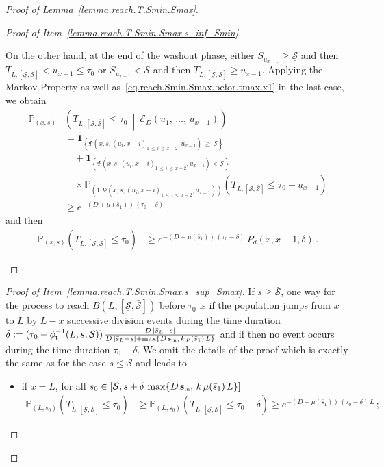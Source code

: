 \documentclass[10pt]{amsart}
\theoremstyle{definition}\newtheorem{defi}[theo]{Definition}\newtheorem{rema}[theo]{Remark}\newtheorem{exam}[theo]{Example}\newtheorem{exem}[theo]{Example}\newtheorem{nota}[theo]{Notation}
\newcommand{\PP}{\mathbb{P}}
\newcommand{\clE}{\mathcal{E}}
\newcommand{\Sin}{{\mathbf s}_{\textrm{\tiny\rm in}}}
\newcommand{\Smin}{\underline{\mathcal{S}}}
\newcommand{\Smax}{\bar{\mathcal{S}}}
\newcommand{\barmu}{\mu(\bar s_1)}
\newcommand{\phit}{\phi_\textsf{t}^{-1}}
\newcommand{\1}{\mathbf{1}}
\begin{document}
\begin{proof}[Proof of Lemma~\ref{lemma.reach.T.Smin.Smax}]
\begin{proof}[{Proof of Item~\eqref{lemma.reach.T.Smin.Smax.s_inf_Smin}}]
\begin{itemize}
On the other hand, at the end of the washout phase, either $S_{u_{x-1}}\geq \Smin$ and then $T_{L,[\Smin,\Smax]}< u_{x-1}\leq\tau_0$ or $S_{u_{x-1}}< \Smin$ and then $T_{L,[\Smin,\Smax]}\geq u_{x-1}$. Applying the Markov Property as well as~\eqref{eq.reach.Smin.Smax.befor.tmax.x1} in the last case, we obtain
\begin{align*}
\PP_{(x,s)}
&\left(T_{L,\left[\Smin,\Smax\right]}\leq\tau_0 \ \middle| \ \clE_D\left(u_1,\,\dots,\,u_{x-1}\right) \right)
\\
&= \1_{\left\{\Psi\left(x,s,(u_i,x-i)_{1\,\leq\,i\,\leq\,x-2},u_{x-1}\right)\,\geq\,\Smin\right\}}\\
&\quad + \1_{\left\{\Psi\left(x,s,(u_i,x-i)_{1\,\leq\,i\,\leq \,x-2},u_{x-1}\right)< \Smin\right\}}\,
\\
&\quad
\times \PP_{\left(1,\Psi\left(x,s,(u_i,x-i)_{1\,\leq\,i\,\leq\,x-2},u_{x-1}\right)\right)}
\left(T_{L,[\Smin,\Smax]}\leq\tau_0-u_{x-1}\right)
\\ 
&\geq e^{-(D+\barmu)\,(\tau_0-\delta)}
\end{align*}
and then
\begin{align}\label{eq.reach.Smin.Smax.befor.tmax.xlarger1}
\PP_{(x,s)}\left(T_{L,[\Smin,\Smax]}\leq \tau_0\right) &\geq e^{-(D+\barmu)\,(\tau_0-\delta)}\,P_d(x,x-1,\delta)\,.
\end{align}
\end{itemize}\let\qed\relax
\end{proof}
\begin{proof}[{Proof of Item~\eqref{lemma.reach.T.Smin.Smax.s_sup_Smax}}] If $s \geq \Smax$, one way for the process to reach $B(L,[\Smin,\Smax])$ before $\tau_0$ is if the population jumps from $x$ to $L$ by $L-x$ successive division events during the time duration $\delta:=(\tau_0-\phit(L, s,\Smax))\,\frac{D\,|\bar s_L-s|}{D\,|\bar s_L-s|+\max\{D\,\Sin,\,k\,\barmu\,L\}}$ and if then no event occurs during the time duration $\tau_0-\delta$. We omit the details of the proof which is exactly the same as for the case $s\leq \Smin$ and leads to
\begin{itemize}
\item if $x=L$, for all $s_0 \in [\Smax,s+\delta\,\max\{D\,\Sin,\,k\,\barmu\,L\}]$
\begin{align*}
\PP_{(L,s_0)}\left(T_{L,[\Smin,\Smax]}\leq \tau_0 \right) &\geq
\PP_{(L,s_0)}\left(T_{L,[\Smin,\Smax]}\leq \tau_0-\delta \right)
\geq e^{-(D+\barmu)\,(\tau_0-\delta)\,L}\,;
\end{align*}


\end{itemize}
\end{proof}
\end{proof}
\end{document}

